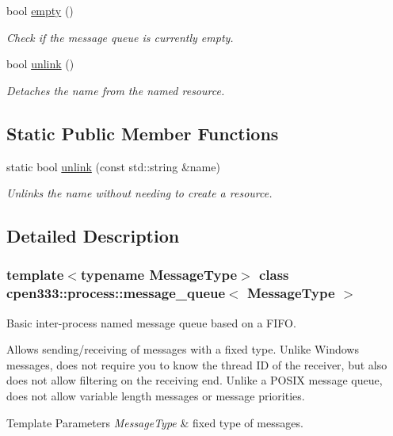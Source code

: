 \begin{DoxyCompactItemize}
bool \hyperlink{classcpen333_1_1process_1_1message__queue_a321bee9b732f97362172c6c4ee8226a4}{empty} ()
\begin{DoxyCompactList}\small\item\em Check if the message queue is currently empty. \end{DoxyCompactList}\item 
bool \hyperlink{classcpen333_1_1process_1_1message__queue_ae94a6503dff948dfc2533f7786839dca}{unlink} ()
\begin{DoxyCompactList}\small\item\em Detaches the name from the named resource. \end{DoxyCompactList}\end{DoxyCompactItemize}
\subsection*{Static Public Member Functions}
\begin{DoxyCompactItemize}
\item 
static bool \hyperlink{classcpen333_1_1process_1_1message__queue_aca172436d5b30c250c301d3c224598b6}{unlink} (const std\+::string \&name)
\begin{DoxyCompactList}\small\item\em Unlinks the name without needing to create a resource. \end{DoxyCompactList}\end{DoxyCompactItemize}


\subsection{Detailed Description}
\subsubsection*{template$<$typename Message\+Type$>$\newline
class cpen333\+::process\+::message\+\_\+queue$<$ Message\+Type $>$}

Basic inter-\/process named message queue based on a F\+I\+FO. 

Allows sending/receiving of messages with a fixed type. Unlike Windows messages, does not require you to know the thread ID of the receiver, but also does not allow filtering on the receiving end. Unlike a P\+O\+S\+IX message queue, does not allow variable length messages or message priorities.


\begin{DoxyTemplParams}{Template Parameters}
{\em Message\+Type} & fixed type of messages. \\
\hline
\end{DoxyTemplParams}


